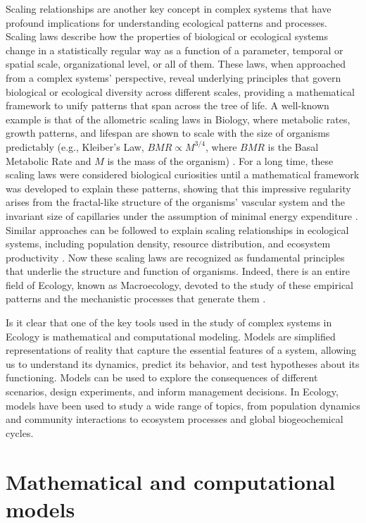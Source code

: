 Scaling relationships are another key concept in complex systems that have
profound implications for understanding ecological patterns and processes.
Scaling laws describe how the properties of biological or ecological systems
change in a statistically regular way as a function of a parameter, temporal or
spatial scale, organizational level, or all of them. These laws, when
approached from a complex systems' perspective, reveal underlying principles
that govern biological or ecological diversity across different scales,
providing a mathematical framework to unify patterns that span across the tree
of life. A well-known example is that of the allometric scaling laws in
Biology, where metabolic rates, growth patterns, and lifespan are shown to
scale with the size of organisms predictably (e.g., Kleiber's Law,
$BMR \propto M^{3/4}$, where $BMR$ is the Basal Metabolic Rate and $M$ is the
mass of the organism) \cite{Peters1983}. For a long time, these scaling laws
were considered biological curiosities until a mathematical framework was
developed to explain these patterns, showing that this impressive regularity
arises from the fractal-like structure of the organisms' vascular system and
the invariant size of capillaries under the assumption of minimal energy
expenditure \cite{West1997}. Similar approaches can be followed to explain
scaling relationships in ecological systems, including population density,
resource distribution, and ecosystem productivity \cite{Brown2004}. Now these
scaling laws are recognized as fundamental principles that underlie the
structure and function of organisms. Indeed, there is an entire field of
Ecology, known as Macroecology, devoted to the study of these empirical
patterns and the mechanistic processes that generate them
\cite{Brown1995Macroecology}.

Is it clear that one of the key tools used in the study of complex systems in
Ecology is mathematical and computational modeling. Models are simplified
representations of reality that capture the essential features of a system,
allowing us to understand its dynamics, predict its behavior, and test
hypotheses about its functioning. Models can be used to explore the
consequences of different scenarios, design experiments, and inform management
decisions. In Ecology, models have been used to study a wide range of topics,
from population dynamics and community interactions to ecosystem processes and
global biogeochemical cycles.

\section{\label{sec:Mathematical and computational models} Mathematical and
  computational models}

